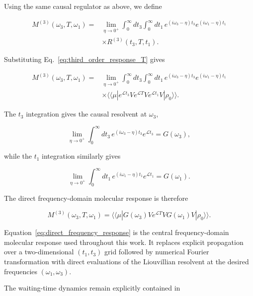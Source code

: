 \documentclass[11pt]{article}
\begin{document}
Using the same causal regulator as above, we define

\begin{align}
M^{(3)}(\omega_3,T,\omega_1)
={}&
\lim_{\eta\rightarrow0^+}
\int_0^\infty dt_3
\int_0^\infty dt_1\,
e^{(i\omega_3-\eta)t_3}
e^{(i\omega_1-\eta)t_1}
\nonumber\\
&\times
R^{(3)}(t_3,T,t_1).
\label{eq:M3_transform}
\end{align}

Substituting Eq.~\eqref{eq:third_order_response_T} gives

\begin{align}
M^{(3)}(\omega_3,T,\omega_1)
={}&
\lim_{\eta\rightarrow0^+}
\int_0^\infty dt_3
\int_0^\infty dt_1\,
e^{(i\omega_3-\eta)t_3}
e^{(i\omega_1-\eta)t_1}
\nonumber\\
&\times
\langle\!\langle\mu|
e^{\mathcal{L}t_3}
V
e^{\mathcal{L}T}
V
e^{\mathcal{L}t_1}
V
|\rho_0\rangle\rangle.
\label{eq:M3_before_resolvents}
\end{align}

The $t_3$ integration gives the causal resolvent at $\omega_3$,

\begin{equation}
\lim_{\eta\rightarrow0^+}
\int_0^\infty
dt_3\,
e^{(i\omega_3-\eta)t_3}
e^{\mathcal{L}t_3}
=
G(\omega_3),
\end{equation}

while the $t_1$ integration similarly gives

\begin{equation}
\lim_{\eta\rightarrow0^+}
\int_0^\infty
dt_1\,
e^{(i\omega_1-\eta)t_1}
e^{\mathcal{L}t_1}
=
G(\omega_1).
\end{equation}

The direct frequency-domain molecular response is therefore

\begin{equation}
\boxed{
M^{(3)}(\omega_3,T,\omega_1)
=
\langle\!\langle\mu|
G(\omega_3)
V
e^{\mathcal{L}T}
V
G(\omega_1)
V
|\rho_0\rangle\rangle.
}
\label{eq:direct_frequency_response}
\end{equation}

Equation~\eqref{eq:direct_frequency_response} is the central
frequency-domain molecular response used throughout this work. It
replaces explicit propagation over a two-dimensional $(t_1,t_3)$ grid
followed by numerical Fourier transformation with direct evaluations
of the Liouvillian resolvent at the desired frequencies
$(\omega_1,\omega_3)$.

The waiting-time dynamics remain explicitly contained in
\end{document}
